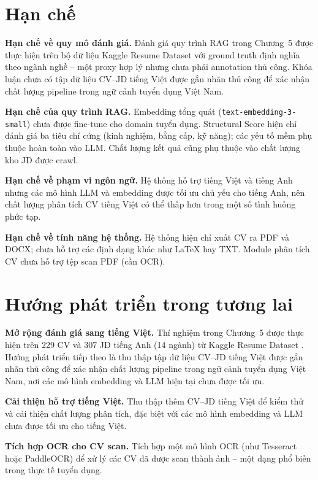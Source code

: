 \documentclass[../DoAn.tex]{subfiles}
\begin{document}
\section{Hạn chế}

\textbf{Hạn chế về quy mô đánh giá.} Đánh giá quy trình RAG trong Chương~5 được thực hiện trên bộ dữ liệu Kaggle Resume Dataset với ground truth định nghĩa theo ngành nghề -- một proxy hợp lý nhưng chưa phải annotation thủ công. Khóa luận chưa có tập dữ liệu CV--JD tiếng Việt được gắn nhãn thủ công để xác nhận chất lượng pipeline trong ngữ cảnh tuyển dụng Việt Nam.

\textbf{Hạn chế của quy trình RAG.} Embedding tổng quát (\texttt{text-embedding-3-small}) chưa được fine-tune cho domain tuyển dụng. Structural Score hiện chỉ đánh giá ba tiêu chí cứng (kinh nghiệm, bằng cấp, kỹ năng); các yếu tố mềm phụ thuộc hoàn toàn vào LLM. Chất lượng kết quả cũng phụ thuộc vào chất lượng kho JD được crawl.

\textbf{Hạn chế về phạm vi ngôn ngữ.} Hệ thống hỗ trợ tiếng Việt và tiếng Anh nhưng các mô hình LLM và embedding được tối ưu chủ yếu cho tiếng Anh, nên chất lượng phân tích CV tiếng Việt có thể thấp hơn trong một số tình huống phức tạp.

\textbf{Hạn chế về tính năng hệ thống.} Hệ thống hiện chỉ xuất CV ra PDF và DOCX; chưa hỗ trợ các định dạng khác như LaTeX hay TXT. Module phân tích CV chưa hỗ trợ tệp scan PDF (cần OCR).

\section{Hướng phát triển trong tương lai}

\textbf{Mở rộng đánh giá sang tiếng Việt.} Thí nghiệm trong Chương~5 được thực hiện trên 229 CV và 307 JD tiếng Anh (14 ngành) từ Kaggle Resume Dataset \cite{kaggle_resume2023}. Hướng phát triển tiếp theo là thu thập tập dữ liệu CV--JD tiếng Việt được gắn nhãn thủ công để xác nhận chất lượng pipeline trong ngữ cảnh tuyển dụng Việt Nam, nơi các mô hình embedding và LLM hiện tại chưa được tối ưu.

\textbf{Cải thiện hỗ trợ tiếng Việt.} Thu thập thêm CV--JD tiếng Việt để kiểm thử và cải thiện chất lượng phân tích, đặc biệt với các mô hình embedding và LLM chưa được tối ưu cho tiếng Việt.

\textbf{Tích hợp OCR cho CV scan.} Tích hợp một mô hình OCR (như Tesseract hoặc PaddleOCR) để xử lý các CV đã được scan thành ảnh -- một dạng phổ biến trong thực tế tuyển dụng.
\end{document}
